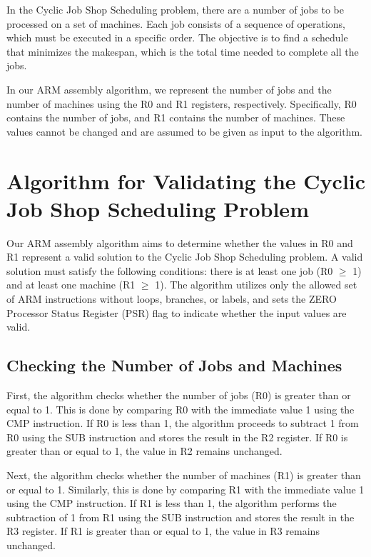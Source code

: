 In the Cyclic Job Shop Scheduling problem, there are a number of jobs to be processed on a set of machines. Each job consists of a sequence of operations, which must be executed in a specific order. The objective is to find a schedule that minimizes the makespan, which is the total time needed to complete all the jobs.

In our ARM assembly algorithm, we represent the number of jobs and the number of machines using the R0 and R1 registers, respectively. Specifically, R0 contains the number of jobs, and R1 contains the number of machines. These values cannot be changed and are assumed to be given as input to the algorithm.

\section{Algorithm for Validating the Cyclic Job Shop Scheduling Problem}

Our ARM assembly algorithm aims to determine whether the values in R0 and R1 represent a valid solution to the Cyclic Job Shop Scheduling problem. A valid solution must satisfy the following conditions: there is at least one job (R0 $\geq$ 1) and at least one machine (R1 $\geq$ 1). The algorithm utilizes only the allowed set of ARM instructions without loops, branches, or labels, and sets the ZERO Processor Status Register (PSR) flag to indicate whether the input values are valid.

\subsection{Checking the Number of Jobs and Machines}

First, the algorithm checks whether the number of jobs (R0) is greater than or equal to 1. This is done by comparing R0 with the immediate value 1 using the CMP instruction. If R0 is less than 1, the algorithm proceeds to subtract 1 from R0 using the SUB instruction and stores the result in the R2 register. If R0 is greater than or equal to 1, the value in R2 remains unchanged.

Next, the algorithm checks whether the number of machines (R1) is greater than or equal to 1. Similarly, this is done by comparing R1 with the immediate value 1 using the CMP instruction. If R1 is less than 1, the algorithm performs the subtraction of 1 from R1 using the SUB instruction and stores the result in the R3 register. If R1 is greater than or equal to 1, the value in R3 remains unchanged.

